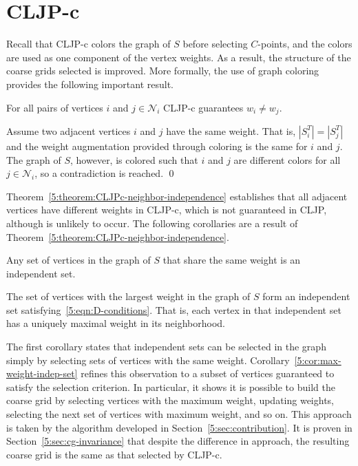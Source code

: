 \documentclass{elsart}
\newenvironment{proof}{\begin{pf}}{\qed\end{pf}}
\begin{document}
\section{CLJP-c}
Recall that CLJP-c colors the graph of $S$ before selecting
$C$-points, and the colors are used as one component of the vertex
weights. As a result, the structure of the coarse grids selected is
improved. More formally, the use of graph coloring provides the
following important result.
\begin{thm}
\label{5:theorem:CLJPc-neighbor-independence}
For all pairs of vertices $i$ and $j \in \mathcal{N}_i$ CLJP-c
guarantees $w_i \ne w_j$.
\end{thm}
\begin{proof}
Assume two adjacent vertices $i$ and $j$ have the same weight. That is,
$|S_i^T| = |S_j^T|$ and the weight augmentation provided through
coloring is the same for $i$ and $j$. The graph of $S$, however, is
colored such that $i$ and $j$ are different colors for all $j \in
\mathcal{N}_i$, so a contradiction is reached.
\end{proof}
Theorem~\ref{5:theorem:CLJPc-neighbor-independence} establishes that
all adjacent vertices have different weights in CLJP-c, which is not
guaranteed in CLJP, although is unlikely to occur. The following
corollaries are a result of
Theorem~\ref{5:theorem:CLJPc-neighbor-independence}.
\begin{cor}
Any set of vertices in the graph of $S$ that share the same weight is
an independent set.
\end{cor}
\begin{cor}
\label{5:cor:max-weight-indep-set}
The set of vertices with the largest weight in the graph of $S$ form
an independent set satisfying~\ref{5:eqn:D-conditions}. That is, each
vertex in that independent set has a uniquely maximal weight in its
neighborhood.
\end{cor}
The first corollary states that independent sets can be selected in
the graph simply by selecting sets of vertices with the same
weight. Corollary~\ref{5:cor:max-weight-indep-set} refines this
observation to a subset of vertices guaranteed to satisfy the
selection criterion. In particular, it shows it is possible to build
the coarse grid by selecting vertices with the maximum weight,
updating weights, selecting the next set of vertices with maximum
weight, and so on. This approach is taken by the algorithm developed
in Section~\ref{5:sec:contribution}. It is proven in
Section~\ref{5:sec:cg-invariance} that despite the difference in
approach, the resulting coarse grid is the same as that selected by
CLJP-c.
\end{document}
